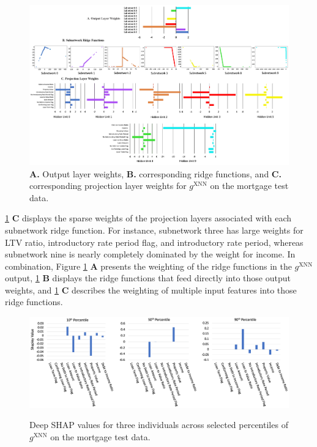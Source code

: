 \documentclass[information,article,submit,moreauthors,pdftex]{definitions/mdpi}
\begin{document}
{\begin{figure}[H]
\centering
\includegraphics[width=16cm]{img/mort_xnn_glob_ridge.png}
\caption{\textbf{A.} Output layer weights, \textbf{B.} corresponding ridge functions, and \textbf{C.} corresponding projection layer weights for $g^\text{XNN}$ on the mortgage test data.}
\label{fig:mort_xnn_glob_ridge}
\end{figure}   

\noindent \ref{fig:mort_xnn_glob_ridge} \textbf{C} displays the sparse weights of the projection layers associated with each subnetwork ridge function. For instance, subnetwork three has large weights for LTV ratio, introductory rate period flag, and introductory rate period, whereas subnetwork nine is nearly completely dominated by the weight for income. In combination, Figure \ref{fig:mort_xnn_glob_ridge} \textbf{A} presents the weighting of the ridge functions in the $g^\text{XNN}$ output, \ref{fig:mort_xnn_glob_ridge} \textbf{B} displays the ridge functions that feed directly into those output weights, and \ref{fig:mort_xnn_glob_ridge} \textbf{C} describes the weighting of multiple input features into those ridge functions.

\begin{figure}[H]
\centering
\includegraphics[width=15cm]{img/mort_xnn_loc.png}
\label{fig:mort_xnn_loc}
\caption{Deep SHAP values for three individuals across selected percentiles of $g^\text{XNN}$ on the mortgage test data.}
\end{figure}

}
\end{document}
